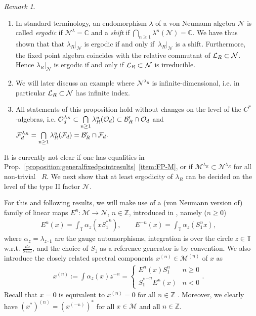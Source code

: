 \documentclass[12pt,a4paper]{amsart}
\numberwithin{equation}{section}
\theoremstyle{remark}
\newtheorem{remark}[theorem]{Remark}
\newcommand{\Cl}{\mathbb{C}}
\newcommand{\Zl}{\mathbb{Z}}
\def\Z{\mathbb{Z}}
\def\T{\mathbb{T}}
\newcommand{\la}{\lambda}
\newcommand{\CM}[0]{\mathcal{M}} \newcommand{\CN}[0]{\mathcal{N}}
\newcommand{\CO}[0]{\mathcal{O}} \newcommand{\CP}[0]{\mathcal{P}}
\begin{document}
\begin{remark}\leavevmode
    \begin{enumerate}
		\item In standard terminology, an endomorphism $\la$ of a von Neumann algebra $\CN$ is called {\em ergodic} if $\CN^{\la}=\Cl$ and a {\em shift} if $\bigcap_{n\geq1}\la^n(\CN)=\Cl$. We have thus shown that that ${\la_R}|_{\CN}$ is ergodic if and only if~${\la_R}|_{\CN}$ is a shift. Furthermore, the fixed point algebra coincides with the relative commutant of $\CL_R\subset\CN$. Hence ${\la_R}|_\CN$ is ergodic if and only if $\CL_R\subset\CN$ is irreducible. 
		\item We will later discuss an example where $\CN^{\la_R}$ is infinite-dimensional, i.e. in particular $\CL_R\subset\CN$ has infinite index.
        \item All statements of this proposition hold without changes on the level of the $C^*$-algebras, i.e. $\CO_d^{\lambda_R}\subset\bigcap\limits_{n\geq1}\lambda_R^n(\CO_d)\subset\CB_R'\cap\CO_d$ and $\mathcal{F}_d^{\lambda_R}=\bigcap\limits_{n\geq1}\lambda_R^n(\mathcal{F}_d)=\mathcal{B}_R'\cap\mathcal{F}_d$.
    \end{enumerate}
\end{remark}


It is currently not clear if one has equalities in Prop.~\ref{proposition:generalfixedpointresults}~\ref{item:FP-M}, or if $\CM^{\la_R}\subset\CN^{\la_R}$ for all non-trivial 
~$R$. We next show that at least ergodicity of $\la_R$ can be decided on the level of the type II factor $\CN$.

For this and following results, we will make use of a (von Neumann version of) family of linear maps $E^n:\CM\to\CN$, $n\in\Z$, introduced in \cite{Cuntz:1977}, namely ($n\geq0$)
\begin{align}\label{eq:Fn}
 E^n(x)=\int_\T\alpha_z(x{S_1^*}^n)%
 ,\qquad
 E^{-n}(x)=\int_\T\alpha_z(S_1^nx)%
 ,
\end{align}
where $\alpha_z=\lambda_{z\cdot1}$ are the gauge automorphisms, integration is over the circle $z\in\T$ w.r.t. $\frac{dz}{2\pi iz}$, and the choice of $S_1$ as a reference generator is by convention. We also introduce the closely related spectral components $x^{(n)}\in\CM^{(n)}$ of $x$ as
\begin{align}\label{eq:spectral-components}
 x^{(n)}
 :=
 \int\alpha_z(x)z^{-n}%
 =
  \begin{cases}
    E^n(x)S_1^n & n\geq0\\
    {S_1^*}^{-n}E^n(x) & n<0 
  \end{cases}
  .
\end{align}
Recall that $x=0$ is equivalent to $x^{(n)}=0$ for all $n\in\Zl$ \cite{Takesaki:1973,Haagerup:1989}. Moreover, we clearly have $(x^*)^{(n)} = (x^{(-n)})^*$ for all $x\in\CM$ and all $n\in\Z$.%
\end{document}
